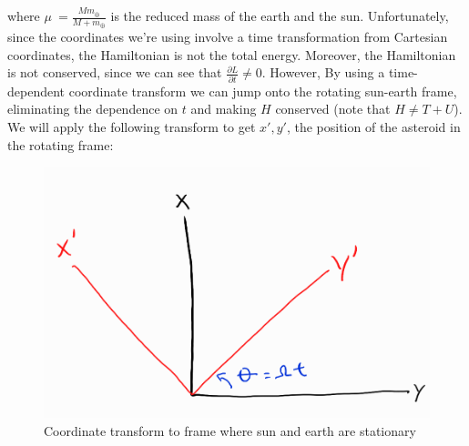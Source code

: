 \documentclass[11pt]{article}
\begin{document}
where $\mu\ = \frac{Mm_\oplus}{M+m_\oplus}$ is the reduced mass of the earth and the sun. Unfortunately, since the coordinates we're using involve a time transformation from Cartesian coordinates, the Hamiltonian is not the total energy. Moreover, the Hamiltonian is not conserved, since we can see that $\frac{\partial L}{\partial t}\neq0$.
However, By using a time-dependent coordinate transform we can jump onto the rotating sun-earth frame, eliminating the dependence on $t$ and making $H$ conserved (note that $H\neq T+U$). We will apply the following transform to get $x',y'$, the position of the asteroid in the rotating frame:

\begin{figure}[H]
    \centering
    \includegraphics[width=0.5\linewidth]{figures/coord_transform2.png}
    \caption{Coordinate transform to frame where sun and earth are stationary}
    \label{fig:coord_transform2}
\end{figure}

\end{document}
